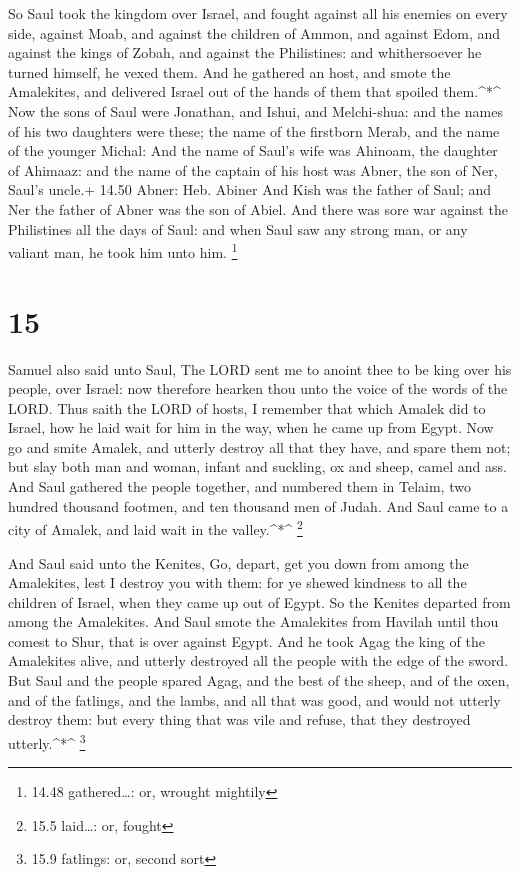  So Saul took the kingdom over Israel, and fought against
all his enemies on every side, against Moab, and against the children of
Ammon, and against Edom, and against the kings of Zobah, and against the
Philistines: and whithersoever he turned himself, he vexed them.
 And he gathered an host, and smote the Amalekites, and
delivered Israel out of the hands of them that spoiled them.\^{}*\^{}
 Now the sons of Saul were Jonathan, and Ishui, and
Melchi-shua: and the names of his two daughters were these; the name of
the firstborn Merab, and the name of the younger Michal: 
And the name of Saul's wife was Ahinoam, the daughter of Ahimaaz: and
the name of the captain of his host was Abner, the son of Ner, Saul's
uncle.+ 14.50 Abner: Heb. Abiner  And Kish was the father
of Saul; and Ner the father of Abner was the son of Abiel. 
And there was sore war against the Philistines all the days of Saul: and
when Saul saw any strong man, or any valiant man, he took him unto him.
\footnote{14.48 gathered\ldots: or, wrought mightily}

\hypertarget{section-14}{%
\section{15}\label{section-14}}

 Samuel also said unto Saul, The LORD sent me to anoint thee
to be king over his people, over Israel: now therefore hearken thou unto
the voice of the words of the LORD.  Thus saith the LORD of
hosts, I remember that which Amalek did to Israel, how he laid wait for
him in the way, when he came up from Egypt.  Now go and
smite Amalek, and utterly destroy all that they have, and spare them
not; but slay both man and woman, infant and suckling, ox and sheep,
camel and ass.  And Saul gathered the people together, and
numbered them in Telaim, two hundred thousand footmen, and ten thousand
men of Judah.  And Saul came to a city of Amalek, and laid
wait in the valley.\^{}*\^{} \footnote{15.5 laid\ldots: or, fought}

 And Saul said unto the Kenites, Go, depart, get you down
from among the Amalekites, lest I destroy you with them: for ye shewed
kindness to all the children of Israel, when they came up out of Egypt.
So the Kenites departed from among the Amalekites.  And Saul
smote the Amalekites from Havilah until thou comest to Shur, that is
over against Egypt.  And he took Agag the king of the
Amalekites alive, and utterly destroyed all the people with the edge of
the sword.  But Saul and the people spared Agag, and the
best of the sheep, and of the oxen, and of the fatlings, and the lambs,
and all that was good, and would not utterly destroy them: but every
thing that was vile and refuse, that they destroyed utterly.\^{}*\^{}
\footnote{15.9 fatlings: or, second sort}

